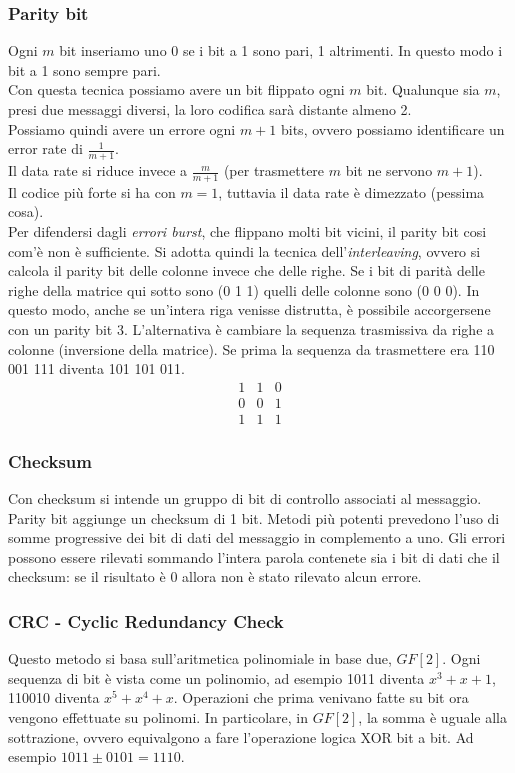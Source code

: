 \documentclass[10pt,a4paper,twoside]{article}
\begin{document}
\subsubsection{Parity bit}
Ogni $m$ bit inseriamo uno 0 se i bit a 1 sono pari, 1 altrimenti. In questo modo i bit a 1 sono sempre pari.\\
Con questa tecnica possiamo avere un bit flippato ogni $m$ bit. Qualunque sia $m$, presi due messaggi diversi, la loro codifica sarà distante almeno 2.\\
Possiamo quindi avere un errore ogni $m+1$ bits, ovvero possiamo identificare un error rate di $\frac{1}{m+1}$.\\
Il data rate si riduce invece a $\frac{m}{m+1}$ (per trasmettere $m$ bit ne servono $m+1$).\\
Il codice più forte si ha con $m=1$, tuttavia il data rate è dimezzato (pessima cosa).\\
Per difendersi dagli \textit{errori burst}, che flippano molti bit vicini, il parity bit cosi com'è non è sufficiente. Si adotta quindi la tecnica dell'\textit{interleaving}, ovvero si calcola il parity bit delle colonne invece che delle righe. Se i bit di parità delle righe della matrice qui sotto sono (0 1 1) quelli delle colonne sono (0 0 0). In questo modo, anche se un'intera riga venisse distrutta, è possibile accorgersene con un parity bit 3. L'alternativa è cambiare la sequenza trasmissiva da righe a colonne (inversione della matrice). Se prima la sequenza da trasmettere era 110 001 111 diventa 101 101 011.
\begin{equation}
\begin{matrix}
1 & 1 & 0\\
0 & 0 & 1\\
1 & 1 & 1
\end{matrix}
\end{equation}

\subsubsection{Checksum}
Con checksum si intende un gruppo di bit di controllo associati al messaggio. Parity bit aggiunge un checksum di 1 bit. Metodi più potenti prevedono l'uso di somme progressive dei bit di dati del messaggio in complemento a uno. Gli errori possono essere rilevati sommando l'intera parola contenete sia i bit di dati che il checksum: se il risultato è 0 allora non è stato rilevato alcun errore.

\subsubsection{CRC - Cyclic Redundancy Check}
Questo metodo si basa sull'aritmetica polinomiale in base due, $GF[2]$.
Ogni sequenza di bit è vista come un polinomio, ad esempio 1011 diventa $x^3+x+1$, 110010 diventa $x^5+x^4+x$. Operazioni che prima venivano fatte su bit ora vengono effettuate su polinomi. In particolare, in $GF[2]$, la somma è uguale alla sottrazione, ovvero equivalgono a fare l'operazione logica XOR bit a bit. Ad esempio $1011\pm 0101=1110$.
\end{document}
